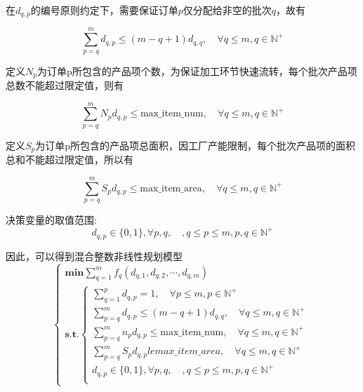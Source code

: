 \documentclass[bwprint]{gmcmthesis}
\begin{document}
在$d_{q,p}$的编号原则约定下，需要保证订单$p$仅分配给非空的批次$q$，故有

\begin{equation}   
\sum_{p=q}^{m} d_{q,p} \le (m-q+1)d_{q,q},\quad \forall q\le m,q\in \mathbb{N}^+\label{编号原则2}
\end{equation}

定义$N_p$为订单p所包含的产品项个数，为保证加工环节快速流转，每个批次产品项总数不能超过限定值，则有

\begin{equation}   
    \sum_{p=q}^{m} N_pd_{q,p} \le \text{max\_item\_num},\quad \forall q \le m, q\in \mathbb{N}^+
\end{equation}

定义$S_p$为订单p所包含的产品项总面积，因工厂产能限制，每个批次产品项的面积总和不能超过限定值，所以有

\begin{equation}   
    \sum_{p=q}^{m} S_pd_{q,p} \le \text{max\_item\_area},\quad \forall q\le m,q\in \mathbb{N}^+
\end{equation}

决策变量的取值范围:
\begin{equation}
    d_{q,p} \in \{0,1\},  \forall p,q,\quad,q\le p \le m,  p,q\in \mathbb{N}^+
\end{equation}

因此，可以得到混合整数非线性规划模型
\begin{equation}
    \begin{cases}
        \mathbf{min} \sum_{q=1}^{m} f_q(d_{q,1},d_{q,2},\cdots,d_{q,m}) \\
        \mathbf{s.t.}
        \begin{cases}
            \sum_{q=1}^{p} d_{q,p}=1,\quad \forall p\le m,p \in \mathbb{N}^+ \\
            \sum_{p=q}^{m} d_{q,p} \le (m-q+1)d_{q,q},\quad \forall q\le m,q\in \mathbb{N}^+  \\
            \sum_{p=q}^{m} n_pd_{q,p} \le \text{max\_item\_num},\quad \forall q \le m, q\in \mathbb{N}^+\\
            \sum_{p=q}^{m} S_pd_{q,p} le max\_item\_area,\quad \forall q\le m,q\in \mathbb{N}^+ \\
            d_{q,p} \in \{0,1\}, \forall p,q,\quad,q\le p \le m,  p,q\in \mathbb{N}^+\\
        \end{cases}  \label{问题二模型}
    \end{cases}
\end{equation}
\end{document}
